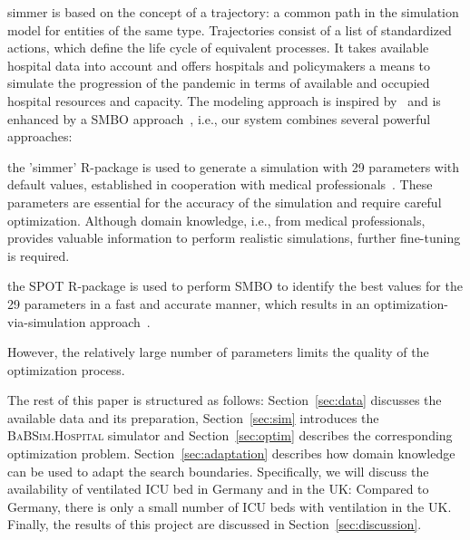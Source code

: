 \documentclass[conference]{IEEEtran}
\newcommand{\babsimhospital}{\textsc{BaBSim.Hospital}\xspace}
\renewenvironment{description}[0]{\begin{compactdesc}}{\end{compactdesc}}
\begin{document}
\gls{simmer} is based on the concept of a trajectory: a common path in the simulation model for entities of the same type.
Trajectories consist of a list of standardized actions, which define the life cycle of equivalent processes. 
It takes available hospital data into account and offers hospitals and policymakers a means to simulate the progression of the pandemic in terms of available and occupied hospital resources and capacity. 
The modeling approach is inspired by~\citet{Lawt19a} and is enhanced by a  \gls{SMBO} approach~\citep{Forr08a}, i.e., our system 
combines several powerful approaches: 
\begin{description}
    \item[Discrete event simulation:] the 'simmer' R-package is used to generate a simulation with 29 parameters with default values, established in cooperation with medical professionals~\citep{Ucar19a}. These parameters are essential for the accuracy of the simulation and require careful optimization. Although domain knowledge, i.e., from medical professionals, provides valuable information to perform realistic simulations, further fine-tuning is required.
    \item [Model-based optimization:] the  \gls{SPOT} R-package is used to perform  \gls{SMBO} to identify the best values for the 29 parameters in a fast and accurate manner, which results in an optimization-via-simulation approach~\cite{Fu94a}.
\end{description}
However, the relatively large number of parameters limits the quality of the optimization process. 

The rest of this paper is structured as follows: 
Section~\ref{sec:data} discusses the available data and its preparation,
Section~\ref{sec:sim} introduces the \babsimhospital simulator and 
Section~\ref{sec:optim} describes the corresponding optimization problem. 
Section~\ref{sec:adaptation} describes how domain knowledge can be used to adapt the search boundaries.
Specifically, we will discuss the availability of ventilated \gls{ICU} bed in Germany and in the UK: Compared to Germany, there is only a small number of ICU beds with ventilation in the UK.
Finally, the results of this project are discussed in Section~\ref{sec:discussion}.
\end{document}
